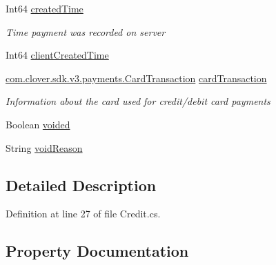 \begin{DoxyCompactItemize}
\item 
Int64 \hyperlink{classcom_1_1clover_1_1sdk_1_1v3_1_1payments_1_1_credit_a7e363c4d7b48fa5556339e31cb7c3cb4}{created\+Time}
\begin{DoxyCompactList}\small\item\em Time payment was recorded on server \end{DoxyCompactList}\item 
Int64 \hyperlink{classcom_1_1clover_1_1sdk_1_1v3_1_1payments_1_1_credit_a59007eafcb6a85400f3b41f101d4aced}{client\+Created\+Time}
\item 
\hyperlink{classcom_1_1clover_1_1sdk_1_1v3_1_1payments_1_1_card_transaction}{com.\+clover.\+sdk.\+v3.\+payments.\+Card\+Transaction} \hyperlink{classcom_1_1clover_1_1sdk_1_1v3_1_1payments_1_1_credit_acade4c966d115789de6e50f7b1bcdec6}{card\+Transaction}
\begin{DoxyCompactList}\small\item\em Information about the card used for credit/debit card payments \end{DoxyCompactList}\item 
Boolean \hyperlink{classcom_1_1clover_1_1sdk_1_1v3_1_1payments_1_1_credit_a7867234134c2b351bcb2eb81f3acd615}{voided}
\item 
String \hyperlink{classcom_1_1clover_1_1sdk_1_1v3_1_1payments_1_1_credit_a15f2c21b091cb72c279bccd926eaf913}{void\+Reason}
\end{DoxyCompactItemize}


\subsection{Detailed Description}


Definition at line 27 of file Credit.\+cs.



\subsection{Property Documentation}
\mbox{\label{classcom_1_1clover_1_1sdk_1_1v3_1_1payments_1_1_credit_ab99189a5b7662b47323aca6862b99c0c}} 
